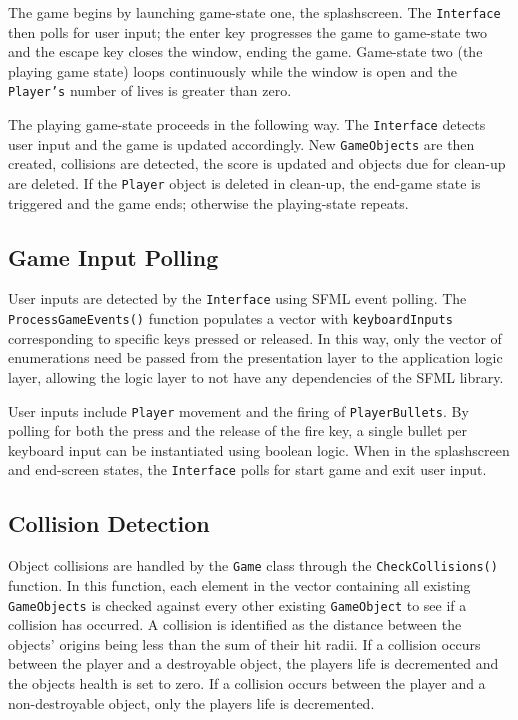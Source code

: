 \documentclass[10pt,twocolumn]{witseiepaper}
\begin{document}
The game begins by launching game-state one, the splashscreen. The \texttt{Interface} then polls for user input; the enter key progresses the game to game-state two and the escape key closes the window, ending the game. Game-state two (the playing game state) loops continuously while the window is open and the \texttt{Player's} number of lives is greater than zero. 

The playing game-state proceeds in the following way. The \texttt{Interface} detects user input and the game is updated accordingly. New \texttt{GameObjects} are then created, collisions are detected, the score is updated and objects due for clean-up are deleted. If the \texttt{Player} object is deleted in clean-up, the end-game state is triggered and the game ends; otherwise the playing-state repeats.

\subsection{Game Input Polling}

User inputs are detected by the \texttt{Interface} using SFML event polling. The \texttt{ProcessGameEvents()} function populates a vector with \texttt{keyboardInputs} corresponding to specific keys pressed or released. In this way, only the vector of enumerations need be passed from the presentation layer to the application logic layer, allowing the logic layer to not have any dependencies of the SFML library.

User inputs include \texttt{Player} movement and the firing of \texttt{PlayerBullets}. By polling for both the press and the release of the fire key, a single bullet per keyboard input can be instantiated using boolean logic. When in the splashscreen and end-screen states, the \texttt{Interface} polls for start game and exit user input.

\subsection{Collision Detection}

Object collisions are handled by the \texttt{Game} class through the \texttt{CheckCollisions()} function. In this function, each element in the vector containing all existing \texttt{GameObjects} is checked against every other existing \texttt{GameObject} to see if a collision has occurred. A collision is identified as the distance between the objects' origins being less than the sum of their hit radii. If a collision occurs between the player and a destroyable object, the players life is decremented and the objects health is set to zero. If a collision occurs between the player and a non-destroyable object, only the players life is decremented.
\end{document}
